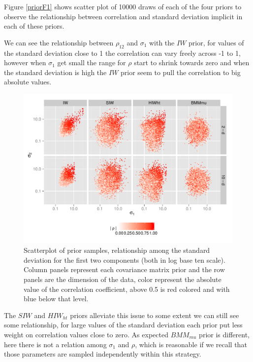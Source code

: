 \documentclass{article}
\begin{document}
 Figure \ref{priorF1} shows scatter plot of 10000 draws of each of the four priors to observe the relationship between correlation and standard deviation implicit in each of these priors. 
 
We can see the relationship between $\rho_{12}$ and $\sigma_1$ with the $IW$ prior, for values of the standard deviation close to 1 the correlation can vary freely across -1 to 1, however when $\sigma_1$ get small the range for $\rho$ start to shrink towards zero and when the standard deviation is high the $IW$ prior seem to pull the correlation to big absolute values. 

\begin{figure}[htbp]
\begin{center}
 \includegraphics[width=\textwidth ]{prior_sis2} 
  \vspace{-.5in}
\caption{Scatterplot of prior samples, relationship among the standard deviation for the first two components (both in log base ten scale).  Column panels represent each covariance matrix prior and the row panels are the dimension of the data, color represent the absolute value of the correlation coefficient, above 0.5 is red colored and with blue below that level.  \label{priorF2}}
\end{center}
\end{figure}

The $SIW$ and $HIW_{ht}$ priors alleviate this issue to some extent we can still see some relationship, for large values of the standard deviation each prior put less weight on correlation values close to zero.  As expected $BMM_{mu}$ prior is different, here there is not a relation among $\sigma_1$ and $\rho$, which is reasonable if we recall that those parameters are sampled independently within this strategy. 
\end{document}
